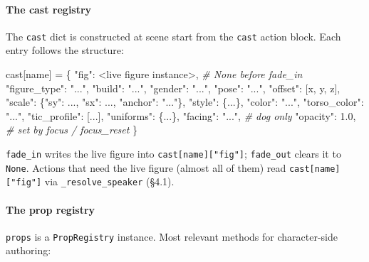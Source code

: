 \documentclass[
  11pt,
]{book}
\newenvironment{Shaded}{}{}
\newcommand{\CommentTok}[1]{\textcolor[rgb]{0.38,0.63,0.69}{\textit{#1}}}
\newcommand{\FloatTok}[1]{\textcolor[rgb]{0.25,0.63,0.44}{#1}}
\newcommand{\NormalTok}[1]{#1}
\newcommand{\OperatorTok}[1]{\textcolor[rgb]{0.40,0.40,0.40}{#1}}
\newcommand{\StringTok}[1]{\textcolor[rgb]{0.25,0.44,0.63}{#1}}
\begin{document}
\paragraph{The cast registry}\label{the-cast-registry}

The \texttt{cast} dict is constructed at scene start from the
\texttt{cast} action block. Each entry follows the structure:

\begin{Shaded}
\begin{Highlighting}[]
\NormalTok{cast[name] }\OperatorTok{=}\NormalTok{ \{}
    \StringTok{"fig"}\NormalTok{:         }\OperatorTok{\textless{}}\NormalTok{live figure instance}\OperatorTok{\textgreater{}}\NormalTok{,  }\CommentTok{\# None before fade\_in}
    \StringTok{"figure\_type"}\NormalTok{: }\StringTok{"..."}\NormalTok{,}
    \StringTok{"build"}\NormalTok{:       }\StringTok{"..."}\NormalTok{,}
    \StringTok{"gender"}\NormalTok{:      }\StringTok{"..."}\NormalTok{,}
    \StringTok{"pose"}\NormalTok{:        }\StringTok{"..."}\NormalTok{,}
    \StringTok{"offset"}\NormalTok{:      [x, y, z],}
    \StringTok{"scale"}\NormalTok{:       \{}\StringTok{"sy"}\NormalTok{: ..., }\StringTok{"sx"}\NormalTok{: ..., }\StringTok{"anchor"}\NormalTok{: }\StringTok{"..."}\NormalTok{\},}
    \StringTok{"style"}\NormalTok{:       \{...\},}
    \StringTok{"color"}\NormalTok{:       }\StringTok{"..."}\NormalTok{,}
    \StringTok{"torso\_color"}\NormalTok{: }\StringTok{"..."}\NormalTok{,}
    \StringTok{"tic\_profile"}\NormalTok{: [...],}
    \StringTok{"uniforms"}\NormalTok{:    \{...\},}
    \StringTok{"facing"}\NormalTok{:      }\StringTok{"..."}\NormalTok{,     }\CommentTok{\# dog only}
    \StringTok{"opacity"}\NormalTok{:     }\FloatTok{1.0}\NormalTok{,       }\CommentTok{\# set by focus / focus\_reset}
\NormalTok{\}}
\end{Highlighting}
\end{Shaded}

\texttt{fade\_in} writes the live figure into
\texttt{cast{[}name{]}{[}"fig"{]}}; \texttt{fade\_out} clears it to
\texttt{None}. Actions that need the live figure (almost all of them)
read \texttt{cast{[}name{]}{[}"fig"{]}} via \texttt{\_resolve\_speaker}
(§4.1).

\paragraph{The prop registry}\label{the-prop-registry}

\texttt{props} is a \texttt{PropRegistry} instance. Most relevant
methods for character-side authoring:
\end{document}
